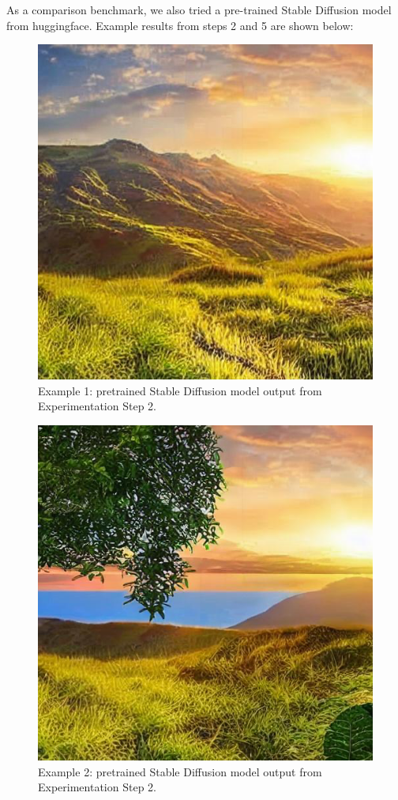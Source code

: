 \documentclass[sigconf]{acmart}
\begin{document}
As a comparison benchmark, we also tried a pre-trained Stable Diffusion model from huggingface. Example results from steps 2 and 5 are shown below:

\begin{figure}[h!]
    \centering
    \includegraphics[width=\linewidth]{stable_diffusion_step_2_1}
    \caption{Example 1: pretrained Stable Diffusion model output from Experimentation Step 2.}
    \label{fig:stable_diffusion_step_2_1}
\end{figure}

\begin{figure}[h!]
    \centering
    \includegraphics[width=\linewidth]{stable_diffusion_step_2_2}
    \caption{Example 2: pretrained Stable Diffusion model output from Experimentation Step 2.}
    \label{fig:stable_diffusion_step_2_2}
\end{figure}
\end{document}
